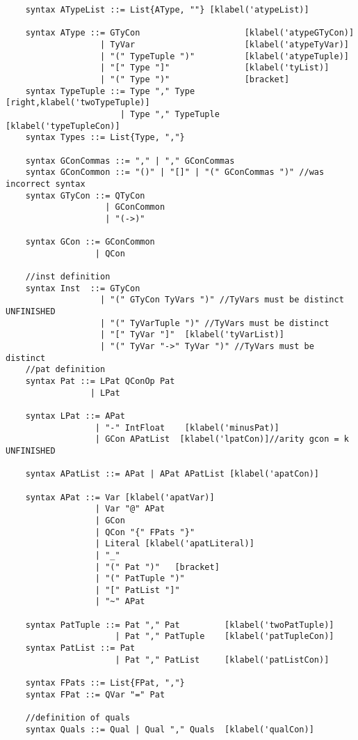 \begin{lstlisting}
    syntax ATypeList ::= List{AType, ""} [klabel('atypeList)]

    syntax AType ::= GTyCon                     [klabel('atypeGTyCon)]
                   | TyVar                      [klabel('atypeTyVar)]
                   | "(" TypeTuple ")"          [klabel('atypeTuple)]
                   | "[" Type "]"               [klabel('tyList)]
                   | "(" Type ")"               [bracket]
    syntax TypeTuple ::= Type "," Type          [right,klabel('twoTypeTuple)]
                       | Type "," TypeTuple     [klabel('typeTupleCon)]
    syntax Types ::= List{Type, ","}

    syntax GConCommas ::= "," | "," GConCommas
    syntax GConCommon ::= "()" | "[]" | "(" GConCommas ")" //was incorrect syntax
    syntax GTyCon ::= QTyCon
                    | GConCommon
                    | "(->)"

    syntax GCon ::= GConCommon
                  | QCon

    //inst definition
    syntax Inst  ::= GTyCon
                   | "(" GTyCon TyVars ")" //TyVars must be distinct UNFINISHED
                   | "(" TyVarTuple ")" //TyVars must be distinct
                   | "[" TyVar "]"  [klabel('tyVarList)]
                   | "(" TyVar "->" TyVar ")" //TyVars must be distinct
    //pat definition
    syntax Pat ::= LPat QConOp Pat
                 | LPat

    syntax LPat ::= APat
                  | "-" IntFloat    [klabel('minusPat)]
                  | GCon APatList  [klabel('lpatCon)]//arity gcon = k UNFINISHED

    syntax APatList ::= APat | APat APatList [klabel('apatCon)]

    syntax APat ::= Var [klabel('apatVar)]
                  | Var "@" APat
                  | GCon
                  | QCon "{" FPats "}"
                  | Literal [klabel('apatLiteral)]
                  | "_"
                  | "(" Pat ")"   [bracket]
                  | "(" PatTuple ")"
                  | "[" PatList "]"
                  | "~" APat

    syntax PatTuple ::= Pat "," Pat         [klabel('twoPatTuple)]
                      | Pat "," PatTuple    [klabel('patTupleCon)]
    syntax PatList ::= Pat
                      | Pat "," PatList     [klabel('patListCon)]

    syntax FPats ::= List{FPat, ","}
    syntax FPat ::= QVar "=" Pat

    //definition of quals
    syntax Quals ::= Qual | Qual "," Quals  [klabel('qualCon)]


\end{lstlisting}
